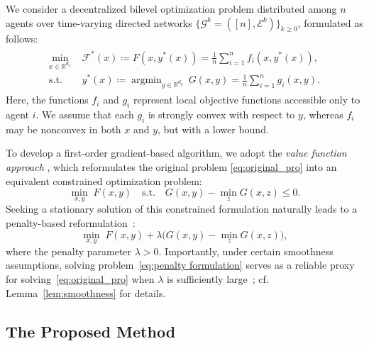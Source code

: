\documentclass{article}
\theoremstyle{plain}
\theoremstyle{definition}
\theoremstyle{remark}
\begin{document}
We consider a decentralized bilevel optimization problem distributed among $n$ agents over time-varying directed networks $\{\mathcal{G}^{k}=([n],\mathcal{E}^{k})\}_{k \ge 0}$, formulated as follows:
\begin{align}\label{eq:original_pro}
\begin{aligned}
    \min_{x \in \mathbb{R}^{d_x}} \; & \mathcal{F}^{*}(x) \coloneqq F(x, y^*(x)) = \frac{1}{n} \sum_{i=1}^{n} f_{i}(x, y^{*}(x)),  \\
    \mathrm{s.t.} \; & y^{*}(x) \coloneqq \mathop{\arg\min}_{y \in \mathbb{R}^{d_y}} \ G(x, y) = \frac{1}{n} \sum_{i=1}^{n} g_{i}(x, y). 
    \end{aligned}
\end{align}
Here, the functions $f_i$ and $g_i$ represent local objective functions accessible only to agent $i$. 
We assume that each $g_i$ is strongly convex with respect to $y$, whereas $f_i$ may be nonconvex in both $x$ and $y$, but with a lower bound. 

To develop a first-order gradient-based algorithm, we adopt the  \textit{value function approach} \cite{Ye1995}, which reformulates the original problem \eqref{eq:original_pro} into an equivalent constrained optimization problem: 
\begin{equation}\label{eq:constrained_reform}
    \min_{x, y} \; F(x, y) \quad \text{s.t.} \quad G(x, y) - \min_{z} G(x, z) \leq 0.
\end{equation}
Seeking a stationary solution of this constrained formulation naturally leads to a penalty-based reformulation~\cite{pmlr-v202-kwon23c,wang2025fully,Yang_Xiao_Ma_Ji_2025}:
\begin{equation}\label{eq:penalty formulation}
    \min_{x, y} \; F(x, y) +\lambda \big( G(x, y) - \min_{z} G(x, z) \big),
\end{equation}
where the penalty parameter $\lambda > 0$. 
Importantly, under certain smoothness assumptions, solving problem~\eqref{eq:penalty formulation} serves as a reliable proxy for solving~\eqref{eq:original_pro} when $\lambda$ is sufficiently large~\cite{pmlr-v202-kwon23c,chennear2025}; cf. Lemma~\ref{lem:smoothness} for details.
    
\subsection{The Proposed Method}
\end{document}
